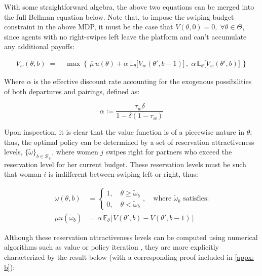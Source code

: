 With some straightforward algebra, the above two equations can be merged into the full Bellman equation below. Note that, to impose the swiping budget constraint in the above MDP, it must be the case that $V(\theta, 0)=0, \; \forall \theta \in \Theta$, since agents with no right-swipes left leave the platform and can't accumulate any additional payoffs:

\begin{equation}
    \begin{aligned} 
        V_w(\theta,b) \;=\;&\max\left\{\,\overline{\mu} \, u(\theta) +\alpha \,\mathbb{E}_\theta \Big[V_w(\theta', b-1)\Big]\,,\; \alpha\,\mathbb{E}_\theta \Big[ V_w(\theta', b)\Big]\,\right\}
    \end{aligned}
\end{equation}

Where $\alpha$ is the effective discount rate accounting for the exogenous possibilities of both departures and pairings, defined as: 

\begin{equation*}
\alpha:=\frac{\tau_w\delta}{1-\delta(1-\tau_w)}
\end{equation*}

Upon inspection, it is clear that the value function is of a piecewise nature in $\theta$; thus, the optimal policy can be determined by a set of reservation attractiveness levels, $\{\tilde\omega\}_{b\in \mathcal{B}_w}$, where women $j$ swipes right for partners who exceed the reservation level for her current budget. These reservation levels must be such that woman $i$ is indifferent between swiping left or right, thus:

\begin{equation*}
    \begin{split}
        \omega(\theta,b)&=\begin{cases}
            1,\quad \theta\geq \widetilde{\omega}_b \\ 
            0, \quad\theta< \widetilde\omega _b  
        \end{cases} , \quad \text{where $\widetilde{\omega}_b$ satisfies:} \\[10pt] 
        \overline\mu u(\widetilde\omega_b) &= \alpha \, \mathbb{E}_\theta\Big[\,V(\theta',b)-V(\theta',b-1)\,\Big]  
    \end{split}
\end{equation*} 

Although these reservation attractiveness levels can be computed using numerical algorithms such as value or policy iteration \citep{rust1987optimal}, they are more explicitly characterized by the result below (with a corresponding proof included in \autoref{appx: b}): 

